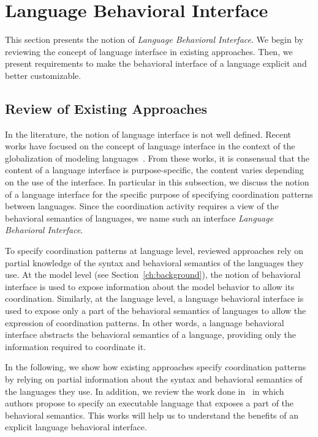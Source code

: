 \section{Language Behavioral Interface}
This section presents the notion of \emph{Language Behavioral Interface}. We begin by reviewing the concept of language interface in existing approaches. Then, we present requirements to make the behavioral interface of a language explicit and better customizable.    

\subsection{Review of Existing Approaches}

In the literature, the notion of language interface is not well defined. Recent works have focused on the concept of language interface in the context of the globalization of modeling languages~\cite{GML_ch1,GML_ch3,GML_ch4,degueule2015melange}. From these works, it is consensual that the content of a language interface is purpose-specific, \ie the content varies depending on the use of the interface. In particular in this subsection, we discuss the notion of a language interface for the specific purpose of specifying coordination patterns between languages. Since the coordination activity requires a view of the behavioral semantics of languages, we name such an interface \emph{Language Behavioral Interface}.
	
To specify coordination patterns at language level, reviewed approaches rely on partial knowledge of the syntax and behavioral semantics of the languages they use. At the model level (see Section~\ref{ch:background}), the notion of behavioral interface is used to expose information about the model behavior to allow its coordination. Similarly, at the language level, a language behavioral interface is used to expose only a part of the behavioral semantics of languages to allow the expression of coordination patterns. In other words, a language behavioral interface abstracts the behavioral semantics of a language, providing only the information required to coordinate it. 
 
In the following, we show how existing approaches specify coordination patterns by relying on partial information about the syntax and behavioral semantics of the languages they use. In addition, we review the work done in~\cite{sle13-combemale} in which authors propose to specify an executable language that exposes a part of the behavioral semantics. This works will help us to understand the benefits of an explicit language behavioral interface.    

